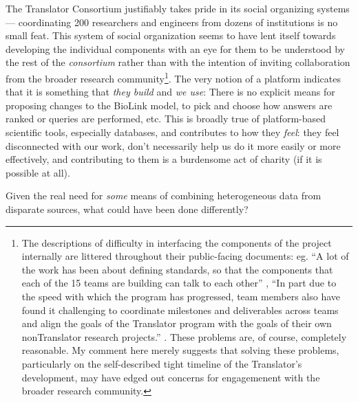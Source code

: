 The Translator Consortium justifiably takes pride in its social
organizing systems \citep{consortiumBiomedicalDataTranslator2019} 
--- coordinating 200 researchers and engineers from dozens of
institutions is no small feat. This system of social organization seems
to have lent itself towards developing the individual components with an
eye for them to be understood by the rest of the \emph{consortium}
rather than with the intention of inviting collaboration from the
broader research community\footnote{The descriptions of difficulty in
  interfacing the components of the project internally are littered
  throughout their public-facing documents: eg. ``A lot of the work has
  been about defining standards, so that the components that each of the
  15 teams are building can talk to each other'' \citep{renaissancecomputinginstituterenciBiomedicalDataTranslator2022} ,
  ``In part due to the speed with which the program has progressed, team
  members also have found it challenging to coordinate milestones and
  deliverables across teams and align the goals of the Translator
  program with the goals of their own nonTranslator research projects.''
  \citep{consortiumBiomedicalDataTranslator2019} . These problems
  are, of course, completely reasonable. My comment here merely suggests
  that solving these problems, particularly on the self-described tight
  timeline of the Translator's development, may have edged out concerns
  for engagemenent with the broader research community.}. The very
notion of a platform indicates that it is something that \emph{they
build} and \emph{we use}: There is no explicit means for proposing
changes to the BioLink model, to pick and choose how answers are ranked
or queries are performed, etc. This is broadly true of platform-based
scientific tools, especially databases, and contributes to how they
\emph{feel}: they feel disconnected with our work, don't necessarily
help us do it more easily or more effectively, and contributing to them
is a burdensome act of charity (if it is possible at all).

Given the real need for \emph{some} means of combining heterogeneous
data from disparate sources, what could have been done differently?

